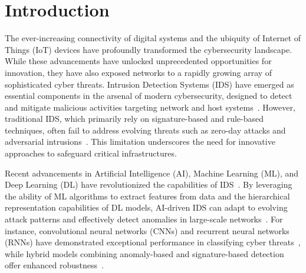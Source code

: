 \section{Introduction}
\label{Introduction}


The ever-increasing connectivity of digital systems and the ubiquity of Internet of Things (IoT) devices have profoundly transformed the cybersecurity landscape. While these advancements have unlocked unprecedented opportunities for innovation, they have also exposed networks to a rapidly growing array of sophisticated cyber threats. Intrusion Detection Systems (IDS) have emerged as essential components in the arsenal of modern cybersecurity, designed to detect and mitigate malicious activities targeting network and host systems~\cite{Mirlekar2022}. However, traditional IDS, which primarily rely on signature-based and rule-based techniques, often fail to address evolving threats such as zero-day attacks and adversarial intrusions~\cite{vinayakumar2019deep}. This limitation underscores the need for innovative approaches to safeguard critical infrastructures.

Recent advancements in Artificial Intelligence (AI), Machine Learning (ML), and Deep Learning (DL) have revolutionized the capabilities of IDS~\cite{Meena2021}. By leveraging the ability of ML algorithms to extract features from data and the hierarchical representation capabilities of DL models, AI-driven IDS can adapt to evolving attack patterns and effectively detect anomalies in large-scale networks~\cite{Islam2023}. For instance, convolutional neural networks (CNNs) and recurrent neural networks (RNNs) have demonstrated exceptional performance in classifying cyber threats~\cite{Varshney2021}, while hybrid models combining anomaly-based and signature-based detection offer enhanced robustness~\cite{Rele2023}.

